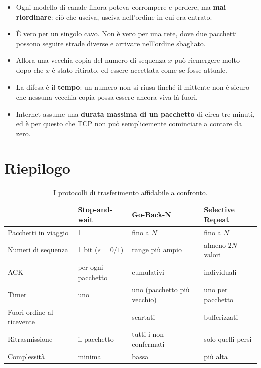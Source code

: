 \begin{itemize}
    \item Ogni modello di canale finora poteva corrompere e perdere, ma \textbf{mai riordinare}: ciò che usciva, usciva
          nell'ordine in cui era entrato.
    \item È vero per un singolo cavo. Non è vero per una rete, dove due pacchetti possono seguire strade diverse e arrivare
          nell'ordine sbagliato.
    \item Allora una vecchia copia del numero di sequenza $x$ può riemergere molto dopo che $x$ è stato ritirato, ed essere
          accettata come se fosse attuale.
    \item La difesa è il \textbf{tempo}: un numero non si riusa finché il mittente non è sicuro che nessuna vecchia copia
          possa essere ancora viva là fuori.
    \item Internet assume una \textbf{durata massima di un pacchetto} di circa tre minuti, ed è per questo che TCP non può
          semplicemente cominciare a contare da zero.
\end{itemize}

\section{Riepilogo}

\begin{table}[H]
\centering
\begin{tabular}{p{3cm}p{3.6cm}p{3.6cm}p{3.6cm}}
\toprule
 & \textbf{Stop-and-wait} & \textbf{Go-Back-N} & \textbf{Selective Repeat} \\
\midrule
Pacchetti in viaggio & 1 & fino a $N$ & fino a $N$ \\
Numeri di sequenza & 1 bit ($s=0/1$) & range più ampio & almeno $2N$ valori \\
ACK & per ogni pacchetto & cumulativi & individuali \\
Timer & uno & uno (pacchetto più vecchio) & uno per pacchetto \\
Fuori ordine al ricevente & --- & scartati & bufferizzati \\
Ritrasmissione & il pacchetto & tutti i non confermati & solo quelli persi \\
Complessità & minima & bassa & più alta \\
\bottomrule
\end{tabular}
\caption{I protocolli di trasferimento affidabile a confronto.}
\end{table}


